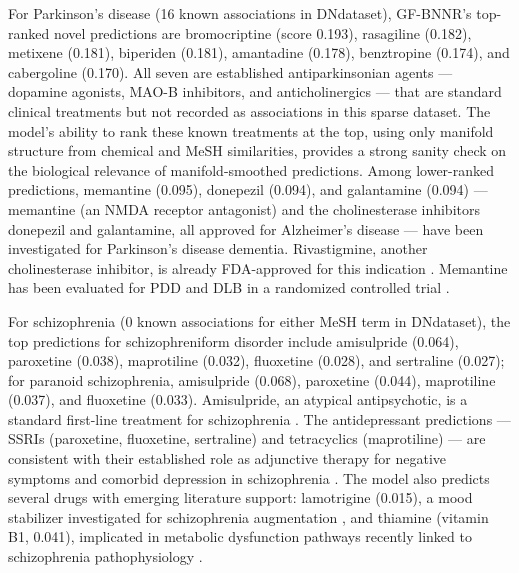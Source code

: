 \documentclass[unnumsec,webpdf,contemporary,large]{oup-authoring-template}
\begin{document}
For Parkinson's disease (16 known associations in DNdataset), GF-BNNR's top-ranked novel predictions are bromocriptine (score 0.193), rasagiline (0.182), metixene (0.181), biperiden (0.181), amantadine (0.178), benztropine (0.174), and cabergoline (0.170). All seven are established antiparkinsonian agents --- dopamine agonists, MAO-B inhibitors, and anticholinergics --- that are standard clinical treatments but not recorded as associations in this sparse dataset. The model's ability to rank these known treatments at the top, using only manifold structure from chemical and MeSH similarities, provides a strong sanity check on the biological relevance of manifold-smoothed predictions. Among lower-ranked predictions, memantine (0.095), donepezil (0.094), and galantamine (0.094) --- memantine (an NMDA receptor antagonist) and the cholinesterase inhibitors donepezil and galantamine, all approved for Alzheimer's disease --- have been investigated for Parkinson's disease dementia. Rivastigmine, another cholinesterase inhibitor, is already FDA-approved for this indication \citep{emre2004}. Memantine has been evaluated for PDD and DLB in a randomized controlled trial \citep{aarsland2009}.

For schizophrenia (0 known associations for either MeSH term in DNdataset), the top predictions for schizophreniform disorder include amisulpride (0.064), paroxetine (0.038), maprotiline (0.032), fluoxetine (0.028), and sertraline (0.027); for paranoid schizophrenia, amisulpride (0.068), paroxetine (0.044), maprotiline (0.037), and fluoxetine (0.033). Amisulpride, an atypical antipsychotic, is a standard first-line treatment for schizophrenia \citep{leucht2013}. The antidepressant predictions --- SSRIs (paroxetine, fluoxetine, sertraline) and tetracyclics (maprotiline) --- are consistent with their established role as adjunctive therapy for negative symptoms and comorbid depression in schizophrenia \citep{singh2010,helfer2016}. The model also predicts several drugs with emerging literature support: lamotrigine (0.015), a mood stabilizer investigated for schizophrenia augmentation \citep{tiihonen2009}, and thiamine (vitamin B1, 0.041), implicated in metabolic dysfunction pathways recently linked to schizophrenia pathophysiology \citep{cao2021}.
\end{document}
